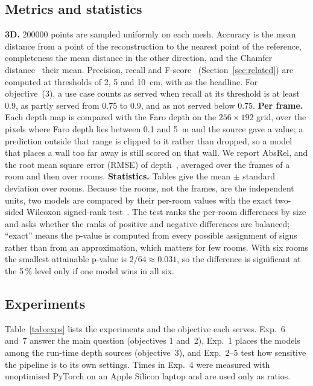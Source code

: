 \subsection{Metrics and statistics}\label{sec:metrics}
\textbf{3D.} \num{200000} points are sampled uniformly on each mesh. Accuracy is the mean distance from a point of the
reconstruction to the nearest point of the reference, completeness the mean distance in the other direction, and the
Chamfer distance~\cite{chamfer} their mean. Precision, recall and F-score~\cite{tanks} (Section~\ref{sec:related})
are computed at thresholds of 2, 5 and \SI{10}{cm}, with \fscore{} as the headline. For objective~(3), a use case
counts as served when recall at its threshold is at least 0.9, as partly served from 0.75 to 0.9, and as not served
below 0.75. \textbf{Per frame.} Each depth map is compared with the Faro depth on the $256\times192$ grid, over the
pixels where Faro depth lies between 0.1 and \SI{5}{m} and the source gave a value; a prediction outside that range is
clipped to it rather than dropped, so a model that places a wall too far away is still scored on that wall. We report
AbsRel, \wone{} and the root mean square error (RMSE) of depth~\cite{eigen14}, averaged over the frames of a room and
then over rooms. \textbf{Statistics.} Tables give the mean $\pm$ standard deviation over rooms. Because the rooms, not
the frames, are the independent units, two models are compared by their per-room values with the exact two-sided
Wilcoxon signed-rank test~\cite{wilcoxon}. The test ranks the per-room differences by size and asks whether the ranks of
positive and negative differences are balanced; ``exact'' means the p-value is computed from every possible assignment
of signs rather than from an approximation, which matters for few rooms. With six rooms the smallest attainable
p-value is $2/64 \approx 0.031$, so the difference is significant at the 5\,\% level only if one model wins in all six.

\subsection{Experiments}\label{sec:experiments}
Table~\ref{tab:exps} lists the experiments and the objective each serves. Exp.~6 and~7 answer the main question
(objectives 1 and~2), Exp.~1 places the models among the run-time depth sources (objective~3), and Exp.~2--5 test how
sensitive the pipeline is to its own settings. Times in Exp.~4 were measured with unoptimised PyTorch on an Apple
Silicon laptop and are used only as ratios.

